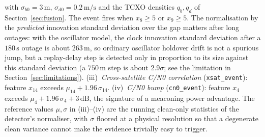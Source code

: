 \documentclass[journal]{IEEEtran}
\begin{document}
with $\sigma_{b0} = 3\,\mathrm{m}$, $\sigma_{d0} = 0.2\,\mathrm{m/s}$ and the TCXO densities
$q_b, q_d$ of Section~\ref{sec:fusion}. The event fires when $x_8 \ge 5$ or $x_9 \ge 5$. The normalisation by
the \emph{predicted} innovation standard deviation over the gap matters after long outages: with the
oscillator model, the clock innovation standard deviation after a $180\,\mathrm{s}$ outage is about
$263\,\mathrm{m}$, so ordinary oscillator holdover drift is not a spurious jump, but a replay-delay step is
detected only in proportion to its size against this standard deviation (a $750\,\mathrm{m}$ step is about
$2.9\sigma$; see the limitation in Section~\ref{sec:limitations}). (iii)~\emph{Cross-satellite C/N0
correlation} (\texttt{xsat\_event}): feature $x_{14}$ exceeds $\mu_{14} + 1.96\,\sigma_{14}$. (iv)~\emph{C/N0
bump} (\texttt{cn0\_event}): feature $x_4$ exceeds $\mu_4 + 1.96\,\sigma_4 + 3\,\mathrm{dB}$, the signature of
a meaconing power advantage. The reference values $\mu, \sigma$ in (iii)--(iv) are the running clean-only
statistics of the detector's normaliser, with $\sigma$ floored at a physical resolution so that a degenerate
clean variance cannot make the evidence trivially easy to trigger.
\end{document}
